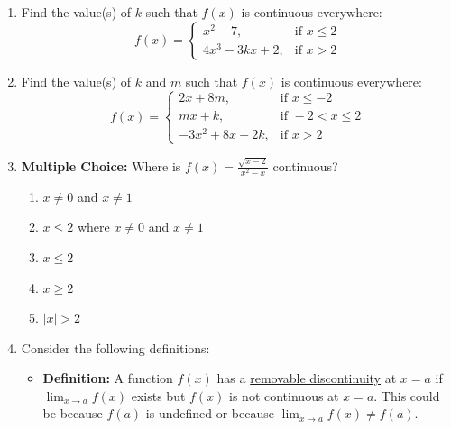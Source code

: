 \documentclass[12pt]{article}
\newif\ifans
\begin{document}
\begin{enumerate}
\ifans{\fbox{$f(x)$ has discontinuity when $x=1$}}\fi

\item Find the value(s) of $k$ such that $f(x)$ is continuous everywhere:\\
$$\displaystyle f(x) = \begin{cases}
x^2-7, & \text{if } x\leq 2 \\
4x^3-3kx+2, & \text{if } x>2 \end{cases}$$

\ifans{\fbox{$\displaystyle k=\frac{37}{6}$}}\fi

\item Find the value(s) of $k$ and $m$ such that $f(x)$ is continuous everywhere: $$f(x) = \begin{cases}
2x+8m, & \text{if } x\leq -2 \\
mx+k, & \text{if } -2<x \leq 2 \\
-3x^2+8x-2k, & \text{if } x>2 \end{cases}$$ 

\ifans{\fbox{$\displaystyle m = \frac{1}{2}$ and $k=1$}}\fi

\item {\bf Multiple Choice:} Where is $f(x)=\frac{\sqrt{x-2}}{x^2-x}$ continuous?

\begin{enumerate}

\item $x\neq 0$ and $x \neq 1$

\item $x \leq 2$ where $x\neq 0$ and $x \neq 1$

\item $x\leq 2$

\item $x \geq 2$

\item $|x|>2$

\end{enumerate}

\ifans{\fbox{d}} \fi

\item Consider the following definitions:

\begin{itemize}

\item {\bf Definition:} A function $f(x)$ has a \underline{removable discontinuity} at $x=a$ if $\displaystyle \lim_{x\rightarrow a}{f(x)}$ exists but $f(x)$ is not continuous at $x=a$.  This could be because $f(a)$ is undefined or because $\displaystyle \lim_{x\rightarrow a}{f(x)} \neq f(a)$.


\end{itemize}
\end{enumerate}
\end{document}
